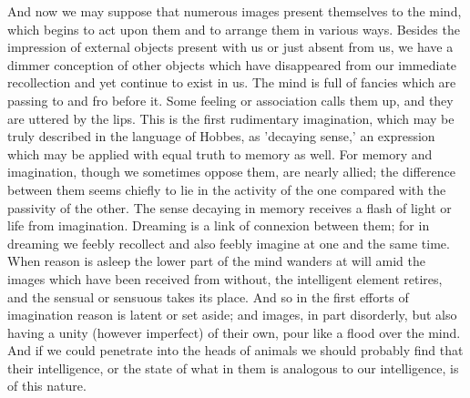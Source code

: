 And now we may suppose that numerous images present themselves to the
mind, which begins to act upon them and to arrange them in various
ways. Besides the impression of external objects present with us or just
absent from us, we have a dimmer conception of other objects which have
disappeared from our immediate recollection and yet continue to exist in
us. The mind is full of fancies which are passing to and fro before it.
Some feeling or association calls them up, and they are uttered by the
lips. This is the first rudimentary imagination, which may be truly
described in the language of Hobbes, as 'decaying sense,' an expression
which may be applied with equal truth to memory as well. For memory and
imagination, though we sometimes oppose them, are nearly allied; the
difference between them seems chiefly to lie in the activity of the one
compared with the passivity of the other. The sense decaying in memory
receives a flash of light or life from imagination. Dreaming is a link
of connexion between them; for in dreaming we feebly recollect and also
feebly imagine at one and the same time. When reason is asleep the
lower part of the mind wanders at will amid the images which have been
received from without, the intelligent element retires, and the sensual
or sensuous takes its place. And so in the first efforts of imagination
reason is latent or set aside; and images, in part disorderly, but also
having a unity (however imperfect) of their own, pour like a flood over
the mind. And if we could penetrate into the heads of animals we should
probably find that their intelligence, or the state of what in them is
analogous to our intelligence, is of this nature.

